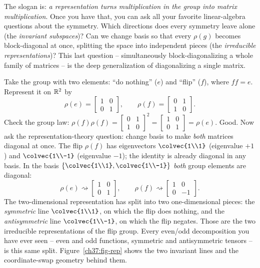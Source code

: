 The slogan is: \emph{a representation turns multiplication in the group into matrix
multiplication}. Once you have that, you can ask all your favorite linear-algebra
questions about the symmetry. Which directions does every symmetry leave alone (the
\emph{invariant subspaces})? Can we change basis so that every $\rho(g)$ becomes
block-diagonal at once, splitting the space into independent pieces (the
\emph{irreducible representations})? This last question -- simultaneously
block-diagonalizing a whole family of matrices -- is the deep generalization of
diagonalizing a single matrix.

\begin{example}
\label{ch37:ex-rep}
Take the group with two elements: ``do nothing'' ($e$) and ``flip'' ($f$), where
$f f = e$. Represent it on $\mathbb{R}^2$ by
\[
  \rho(e) = \begin{bmatrix}1&0\\0&1\end{bmatrix},\qquad
  \rho(f) = \begin{bmatrix}0&1\\1&0\end{bmatrix}.
\]
Check the group law: $\rho(f)\rho(f) = \begin{bmatrix}0&1\\1&0\end{bmatrix}^2 =
\begin{bmatrix}1&0\\0&1\end{bmatrix} = \rho(e)$. Good. Now ask the
representation-theory question: change basis to make \emph{both} matrices diagonal
at once. The flip $\rho(f)$ has eigenvectors $\colvec{1\\1}$ (eigenvalue $+1$) and
$\colvec{1\\-1}$ (eigenvalue $-1$); the identity is already diagonal in any basis.
In the basis $\{\colvec{1\\1},\colvec{1\\-1}\}$ \emph{both} group elements are
diagonal:
\[
  \rho(e)\rightsquigarrow\begin{bmatrix}1&0\\0&1\end{bmatrix},\qquad
  \rho(f)\rightsquigarrow\begin{bmatrix}1&0\\0&-1\end{bmatrix}.
\]
The two-dimensional representation has split into two one-dimensional pieces: the
\emph{symmetric} line $\colvec{1\\1}$, on which the flip does nothing, and the
\emph{antisymmetric} line $\colvec{1\\-1}$, on which the flip negates. Those are the
two irreducible representations of the flip group. Every even/odd decomposition you
have ever seen -- even and odd functions, symmetric and antisymmetric tensors -- is
this same split. Figure~\ref{ch37:fig-rep} shows the two invariant lines and the
coordinate-swap geometry behind them.
\end{example}


